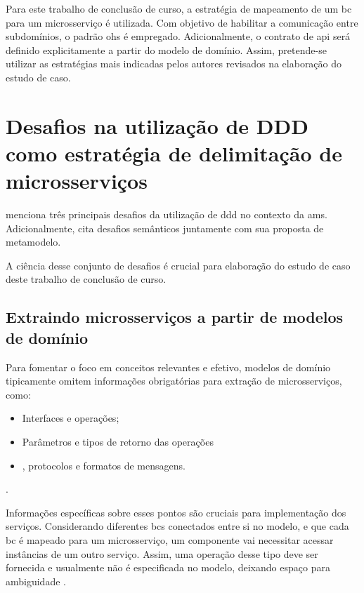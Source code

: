 Para este trabalho de conclusão de curso, a estratégia de mapeamento de um \acrshort{bc} para um microsserviço é utilizada. Com objetivo de habilitar a comunicação entre subdomínios, o padrão \acrfull{ohs} é empregado. Adicionalmente, o contrato de \acrshort{api} será definido explicitamente a partir do modelo de domínio. Assim, pretende-se utilizar as estratégias mais indicadas pelos autores revisados na elaboração do estudo de caso.

\section{Desafios na utilização de DDD como estratégia de delimitação de microsserviços}
 menciona três principais desafios da utilização de \acrshort{ddd} no contexto da \acrshort{ams}. Adicionalmente,  cita desafios semânticos juntamente com sua proposta de metamodelo.

A ciência desse conjunto de desafios é crucial para elaboração do estudo de caso deste trabalho de conclusão de curso.

\subsection{Extraindo microsserviços a partir de modelos de domínio}
Para fomentar o foco em conceitos relevantes e  efetivo, modelos de domínio tipicamente omitem informações obrigatórias para extração de microsserviços, como:
\begin{itemize}
    \item Interfaces e operações;
    \item Parâmetros e tipos de retorno das operações
    \item {}, protocolos e formatos de mensagens.
\end{itemize}
\cite{Rademacher201836}.

Informações específicas sobre esses pontos são cruciais para implementação dos serviços. Considerando diferentes \acrshort{bc}s conectados entre si no modelo, e que cada \acrshort{bc} é mapeado para um microsserviço, um componente vai necessitar acessar instâncias de um outro serviço. Assim, uma operação desse tipo deve ser fornecida e usualmente não é especificada no modelo, deixando espaço para ambiguidade \cite{Rademacher201836}.

